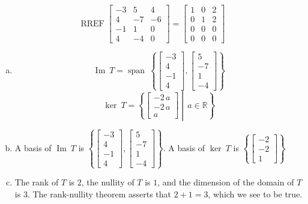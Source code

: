 \begin{exerciseAnswer} 


\[\operatorname{RREF} \left[\begin{array}{ccc}
-3 & 5 & 4 \\
4 & -7 & -6 \\
-1 & 1 & 0 \\
4 & -4 & 0
\end{array}\right] = \left[\begin{array}{ccc}
1 & 0 & 2 \\
0 & 1 & 2 \\
0 & 0 & 0 \\
0 & 0 & 0
\end{array}\right] \]


\begin{enumerate}[(a)]
\item \[\operatorname{Im}\ T = \operatorname{span}\  \left\{ \left[\begin{array}{c}
-3 \\
4 \\
-1 \\
4
\end{array}\right] , \left[\begin{array}{c}
5 \\
-7 \\
1 \\
-4
\end{array}\right] \right\} \]\[\operatorname{ker}\ T =  \left\{ \left[\begin{array}{c}
-2 \, a \\
-2 \, a \\
a
\end{array}\right] \middle|\,a\in\mathbb{R}\right\} \]
\item  A basis of \(\operatorname{Im}\ T\) is \( \left\{ \left[\begin{array}{c}
-3 \\
4 \\
-1 \\
4
\end{array}\right] , \left[\begin{array}{c}
5 \\
-7 \\
1 \\
-4
\end{array}\right] \right\} \). A basis of \(\operatorname{ker}\ T\) is \( \left\{ \left[\begin{array}{c}
-2 \\
-2 \\
1
\end{array}\right] \right\} \)
\item  The rank of \(T\) is \( 2 \), the nullity of \(T\) is \( 1 \), and the dimension of the domain of \(T\) is \( 3 \). The rank-nullity theorem asserts that \( 2 + 1 = 3 \), which we see to be true. 
\end{enumerate}
    
\end{exerciseAnswer}
    
